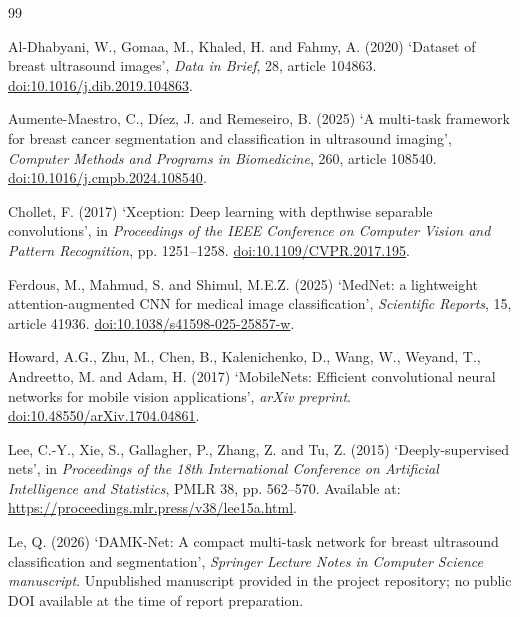 \documentclass[12pt,a4paper,oneside]{report}
\begin{document}
\clearpage
\begin{thebibliography}{99}

Al-Dhabyani, W., Gomaa, M., Khaled, H. and Fahmy, A. (2020)
`Dataset of breast ultrasound images',
\textit{Data in Brief}, 28, article 104863.
\href{https://doi.org/10.1016/j.dib.2019.104863}{doi:10.1016/j.dib.2019.104863}.

Aumente-Maestro, C., Díez, J. and Remeseiro, B. (2025)
`A multi-task framework for breast cancer segmentation and classification in ultrasound imaging',
\textit{Computer Methods and Programs in Biomedicine}, 260, article 108540.
\href{https://doi.org/10.1016/j.cmpb.2024.108540}{doi:10.1016/j.cmpb.2024.108540}.

Chollet, F. (2017)
`Xception: Deep learning with depthwise separable convolutions',
in \textit{Proceedings of the IEEE Conference on Computer Vision and Pattern Recognition}, pp. 1251--1258.
\href{https://doi.org/10.1109/CVPR.2017.195}{doi:10.1109/CVPR.2017.195}.

Ferdous, M., Mahmud, S. and Shimul, M.E.Z. (2025)
`MedNet: a lightweight attention-augmented CNN for medical image classification',
\textit{Scientific Reports}, 15, article 41936.
\href{https://doi.org/10.1038/s41598-025-25857-w}{doi:10.1038/s41598-025-25857-w}.

Howard, A.G., Zhu, M., Chen, B., Kalenichenko, D., Wang, W., Weyand, T., Andreetto, M. and Adam, H. (2017)
`MobileNets: Efficient convolutional neural networks for mobile vision applications',
\textit{arXiv preprint}.
\href{https://doi.org/10.48550/arXiv.1704.04861}{doi:10.48550/arXiv.1704.04861}.

Lee, C.-Y., Xie, S., Gallagher, P., Zhang, Z. and Tu, Z. (2015)
`Deeply-supervised nets',
in \textit{Proceedings of the 18th International Conference on Artificial Intelligence and Statistics}, PMLR 38, pp. 562--570.
Available at: \url{https://proceedings.mlr.press/v38/lee15a.html}.

Le, Q. (2026)
`DAMK-Net: A compact multi-task network for breast ultrasound classification and segmentation',
\textit{Springer Lecture Notes in Computer Science manuscript}. Unpublished manuscript provided in the project repository; no public DOI available at the time of report preparation.


\end{thebibliography}
\end{document}
